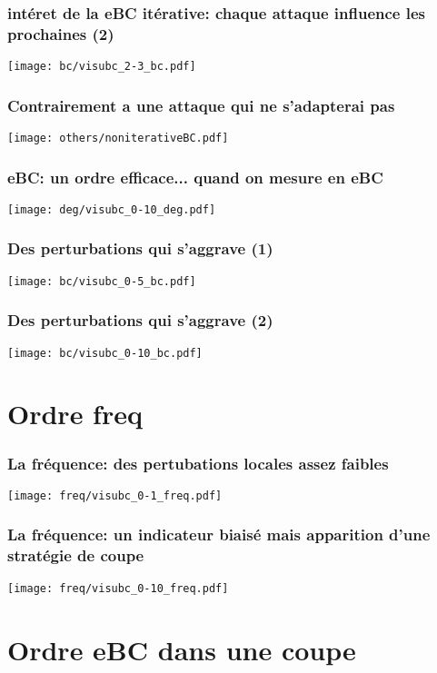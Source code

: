 \documentclass[aspectratio=169]{beamer}
\begin{document}
    \begin{frame}
        \centering
        \frametitle{intéret de la eBC itérative: chaque attaque influence les prochaines (2)}
        \texttt{[image: bc/visubc\_2-3\_bc.pdf]}
    \end{frame}

    \begin{frame}
        \frametitle{Contrairement a une attaque qui ne s'adapterai pas}
        \centering
        \texttt{[image: others/noniterativeBC.pdf]}
    \end{frame}

    \begin{frame}
        \frametitle{eBC: un ordre efficace... quand on mesure en eBC}
        \texttt{[image: deg/visubc\_0-10\_deg.pdf]}
    \end{frame}

    \begin{frame}
        \centering
        \frametitle{Des perturbations qui s'aggrave (1)}
        \texttt{[image: bc/visubc\_0-5\_bc.pdf]}
    \end{frame}

    \begin{frame}
        \centering
        \frametitle{Des perturbations qui s'aggrave (2)}
        \texttt{[image: bc/visubc\_0-10\_bc.pdf]}
    \end{frame}

    \section{Ordre freq}

    \begin{frame}
        \frametitle{La fréquence: des pertubations locales assez faibles}
        \texttt{[image: freq/visubc\_0-1\_freq.pdf]}
    \end{frame}

    \begin{frame}
        \frametitle{La fréquence: un indicateur biaisé mais apparition d'une stratégie de coupe}
        \texttt{[image: freq/visubc\_0-10\_freq.pdf]}
    \end{frame}

    \section{Ordre eBC dans une coupe}
    
\end{document}

